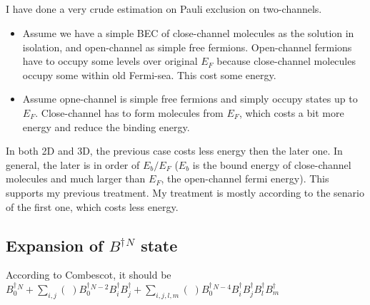\subsection{}
I have done a very crude estimation on Pauli exclusion on two-channels.  

\begin{itemize}
	\item Assume we have a simple BEC of close-channel molecules as the solution in isolation, and open-channel as simple free fermions.  Open-channel fermions have to occupy some levels over original $E_F$ because close-channel molecules occupy some within old Fermi-sea. This cost some energy. 
	\item Assume opne-channel is simple free fermions and simply occupy states up to $E_F$. Close-channel has to form molecules from $E_F$, which costs a bit more energy and reduce the binding energy.  
\end{itemize}
In both 2D and 3D, the previous case costs less energy then the later one.  In general, the later is in order of $E_b/E_F$ ($E_b$ is the bound energy of close-channel molecules and much larger than $E_F$, the open-channel fermi energy).  This supports my previous treatment.  My treatment is mostly according to the senario of the first one, which costs less energy. 

\subsection{Expansion of $B^\dagger{}^N$ state}
According to Combescot, it should be $B_0^\dagger{}^N+\sum_{i,j}(\;)B_0^\dagger{}^{N-2}B_i^\dagger{}B_j^\dagger+\sum_{i,j,l,m}(\;)B_0^\dagger{}^{N-4}B_i^\dagger{}B_j^\dagger{}B_l^\dagger{}B_m^\dagger$